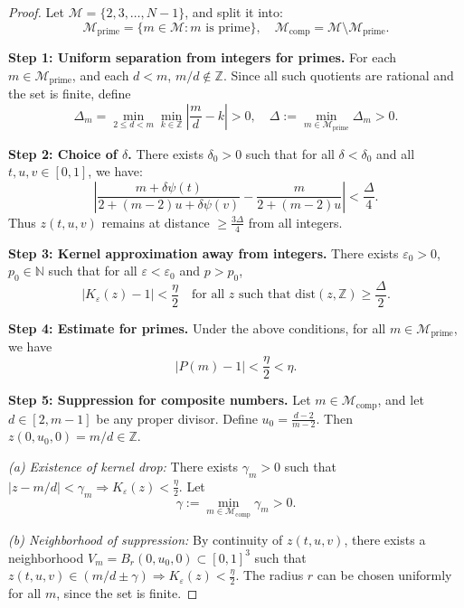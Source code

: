 \documentclass[12pt]{article}
\theoremstyle{definition}
\theoremstyle{plain}
\theoremstyle{remark}
\begin{document}
\begin{proof}
Let \( \mathcal{M} = \{2,3,\dots,N-1\} \), and split it into:
\[
\mathcal{M}_{\mathrm{prime}} = \{m \in \mathcal{M} : m \text{ is prime}\}, \quad
\mathcal{M}_{\mathrm{comp}} = \mathcal{M} \setminus \mathcal{M}_{\mathrm{prime}}.
\]

\textbf{Step 1: Uniform separation from integers for primes.}  
For each \( m \in \mathcal{M}_{\mathrm{prime}} \), and each \( d < m \), \( m/d \notin \mathbb{Z} \). Since all such quotients are rational and the set is finite, define
\[
\Delta_m = \min_{2 \leq d < m} \min_{k \in \mathbb{Z}} \left| \frac{m}{d} - k \right| > 0,
\quad
\Delta := \min_{m \in \mathcal{M}_{\mathrm{prime}}} \Delta_m > 0.
\]

\textbf{Step 2: Choice of \( \delta \).}  
There exists \( \delta_0 > 0 \) such that for all \( \delta < \delta_0 \) and all \( t,u,v \in [0,1] \), we have:
\[
\left| \frac{m + \delta \psi(t)}{2 + (m-2)u + \delta \psi(v)} - \frac{m}{2 + (m-2)u} \right| < \frac{\Delta}{4}.
\]
Thus \( z(t,u,v) \) remains at distance \( \geq \frac{3\Delta}{4} \) from all integers.

\textbf{Step 3: Kernel approximation away from integers.}  
There exists \( \varepsilon_0 > 0 \), \( p_0 \in \mathbb{N} \) such that for all \( \varepsilon < \varepsilon_0 \) and \( p > p_0 \),
\[
\left| K_\varepsilon(z) - 1 \right| < \frac{\eta}{2}
\quad \text{for all } z \text{ such that } \mathrm{dist}(z, \mathbb{Z}) \geq \frac{\Delta}{2}.
\]

\textbf{Step 4: Estimate for primes.}  
Under the above conditions, for all \( m \in \mathcal{M}_{\mathrm{prime}} \), we have
\[
|P(m) - 1| < \frac{\eta}{2} < \eta.
\]

\textbf{Step 5: Suppression for composite numbers.}  
Let \( m \in \mathcal{M}_{\mathrm{comp}} \), and let \( d \in [2, m-1] \) be any proper divisor. Define \( u_0 = \frac{d - 2}{m - 2} \). Then \( z(0,u_0,0) = m/d \in \mathbb{Z} \).

\textit{(a) Existence of kernel drop:} There exists \( \gamma_m > 0 \) such that \( |z - m/d| < \gamma_m \Rightarrow K_\varepsilon(z) < \frac{\eta}{2} \). Let
\[
\gamma := \min_{m \in \mathcal{M}_{\mathrm{comp}}} \gamma_m > 0.
\]

\textit{(b) Neighborhood of suppression:} By continuity of \( z(t,u,v) \), there exists a neighborhood \( V_m = B_r(0,u_0,0) \subset [0,1]^3 \) such that \( z(t,u,v) \in (m/d \pm \gamma) \Rightarrow K_\varepsilon(z) < \frac{\eta}{2} \). The radius \( r \) can be chosen uniformly for all \( m \), since the set is finite.


\end{proof}
\end{document}
